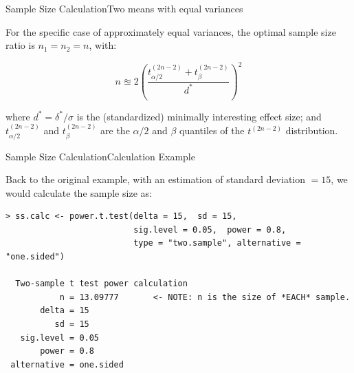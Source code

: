 \begin{frame}{Sample Size Calculation}{Two means with equal variances}

For the specific case of approximately equal variances, the optimal sample size ratio is $n_1 = n_2 = n$, with:

\begin{equation*}
n \approxeq 2\left(\frac{t^{(2n-2)}_{\alpha/2}+t^{(2n-2)}_{\beta}}{d^*}\right)^2
\end{equation*}

where $d^* = \delta^*/\sigma$ is the (standardized) minimally interesting effect size; and $t^{(2n-2)}_{\alpha/2}$ and $t^{(2n-2)}_{\beta}$ are the $\alpha/2$ and $\beta$ quantiles of the $t^{(2n-2 )}$ distribution.\bigskip
\end{frame}

\begin{frame}[fragile]{Sample Size Calculation}{Calculation Example}

Back to the original example, with an estimation of standard deviation $= 15$,
we would calculate the sample size as:

{\smaller
\begin{verbatim}
> ss.calc <- power.t.test(delta = 15,  sd = 15,
                          sig.level = 0.05,  power = 0.8,
                          type = "two.sample", alternative = "one.sided")

  Two-sample t test power calculation
           n = 13.09777       <- NOTE: n is the size of *EACH* sample.
       delta = 15
          sd = 15
   sig.level = 0.05
       power = 0.8
 alternative = one.sided
\end{verbatim}}
\end{frame}



